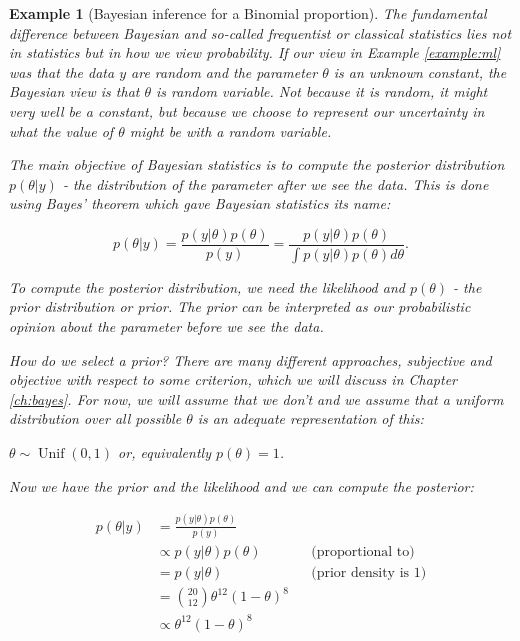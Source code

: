 \documentclass{book}
\theoremstyle{plain}%
\newtheorem{prototheorem}{Example}[section]
\newenvironment{cexample}
   {\colorlet{shadecolor}{gray!10}\begin{shaded}\begin{prototheorem}}
   {\end{prototheorem}\end{shaded}}
\theoremstyle{definition}
\DeclareMathOperator{\Unif}{Unif}
\begin{document}
\begin{cexample}[Bayesian inference for a Binomial proportion]

The fundamental difference between Bayesian and so-called frequentist or classical statistics lies not in statistics but in how we view probability. If our view in Example \ref{example:ml} was that the data $y$ are random and the parameter $\theta$ is an unknown constant, the Bayesian view is that $\theta$ is random variable. Not because it is random, it might very well be a constant, but because we choose to represent our uncertainty in what the value of $\theta$ might be with a random variable.

The main objective of Bayesian statistics is to compute the \emph{posterior distribution} $p(\theta|y)$ - the distribution of the parameter after we see the data. This is done using Bayes' theorem which gave Bayesian statistics its name:

$$p(\theta|y) = \frac{p(y|\theta)p(\theta)}{p(y)} = \frac{p(y|\theta)p(\theta)}{\int p(y|\theta)p(\theta)d\theta}.$$

To compute the posterior distribution, we need the likelihood and $p(\theta)$ - the \emph{prior distribution} or \emph{prior}. The prior can be interpreted as our probabilistic opinion about the parameter before we see the data.

How do we select a prior? There are many different approaches, subjective and objective with respect to some criterion, which we will discuss in Chapter \ref{ch:bayes}. For now, we will assume that we don't and we assume that a uniform distribution over all possible $\theta$ is an adequate representation of this:

\begin{center}
$\theta \sim \Unif(0,1)$ or, equivalently $p(\theta) = 1$.
\end{center}

Now we have the prior and the likelihood and we can compute the posterior:

\begin{align*}
p(\theta|y) &= \frac{p(y|\theta)p(\theta)}{p(y)} \\
&\propto p(y|\theta)p(\theta) && \text{(proportional to)} \\
&= p(y|\theta) && \text{(prior density is 1)} \\
&=  {20 \choose 12} \theta^{12}(1-\theta)^{8} \\
&\propto \theta^{12}(1-\theta)^{8}
\end{align*}


\end{cexample}
\end{document}
